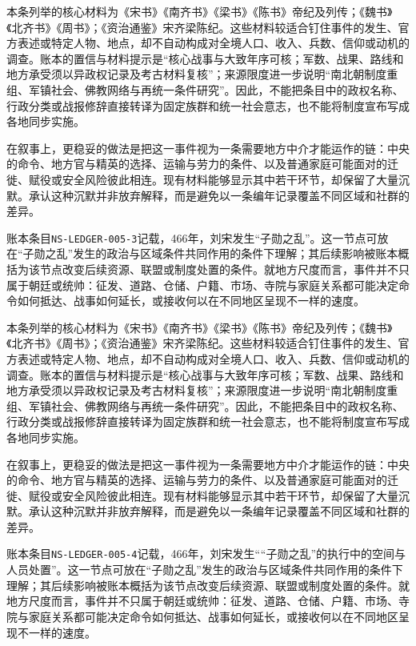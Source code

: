 本条列举的核心材料为《宋书》《南齐书》《梁书》《陈书》帝纪及列传；《魏书》《北齐书》《周书》；《资治通鉴》宋齐梁陈纪。这些材料较适合钉住事件的发生、官方表述或特定人物、地点，却不自动构成对全境人口、收入、兵数、信仰或动机的调查。账本的置信与材料提示是“核心战事与大致年序可核；军数、战果、路线和地方承受须以异政权记录及考古材料复核”；来源限度进一步说明“南北朝制度重组、军镇社会、佛教网络与再统一条件研究”。因此，不能把条目中的政权名称、行政分类或战报修辞直接转译为固定族群和统一社会意志，也不能将制度宣布写成各地同步实施。

在叙事上，更稳妥的做法是把这一事件视为一条需要地方中介才能运作的链：中央的命令、地方官与精英的选择、运输与劳力的条件、以及普通家庭可能面对的迁徙、赋役或安全风险彼此相连。现有材料能够显示其中若干环节，却保留了大量沉默。承认这种沉默并非放弃解释，而是避免以一条编年记录覆盖不同区域和社群的差异。

账本条目\texttt{NS-LEDGER-005-3}记载，466年，刘宋发生“子勋之乱”。这一节点可放在“子勋之乱”发生的政治与区域条件共同作用的条件下理解；其后续影响被账本概括为该节点改变后续资源、联盟或制度处置的条件。就地方尺度而言，事件并不只属于朝廷或统帅：征发、道路、仓储、户籍、市场、寺院与家庭关系都可能决定命令如何抵达、战事如何延长，或接收何以在不同地区呈现不一样的速度。

本条列举的核心材料为《宋书》《南齐书》《梁书》《陈书》帝纪及列传；《魏书》《北齐书》《周书》；《资治通鉴》宋齐梁陈纪。这些材料较适合钉住事件的发生、官方表述或特定人物、地点，却不自动构成对全境人口、收入、兵数、信仰或动机的调查。账本的置信与材料提示是“核心战事与大致年序可核；军数、战果、路线和地方承受须以异政权记录及考古材料复核”；来源限度进一步说明“南北朝制度重组、军镇社会、佛教网络与再统一条件研究”。因此，不能把条目中的政权名称、行政分类或战报修辞直接转译为固定族群和统一社会意志，也不能将制度宣布写成各地同步实施。

在叙事上，更稳妥的做法是把这一事件视为一条需要地方中介才能运作的链：中央的命令、地方官与精英的选择、运输与劳力的条件、以及普通家庭可能面对的迁徙、赋役或安全风险彼此相连。现有材料能够显示其中若干环节，却保留了大量沉默。承认这种沉默并非放弃解释，而是避免以一条编年记录覆盖不同区域和社群的差异。

账本条目\texttt{NS-LEDGER-005-4}记载，466年，刘宋发生““子勋之乱”的执行中的空间与人员处置”。这一节点可放在“子勋之乱”发生的政治与区域条件共同作用的条件下理解；其后续影响被账本概括为该节点改变后续资源、联盟或制度处置的条件。就地方尺度而言，事件并不只属于朝廷或统帅：征发、道路、仓储、户籍、市场、寺院与家庭关系都可能决定命令如何抵达、战事如何延长，或接收何以在不同地区呈现不一样的速度。

